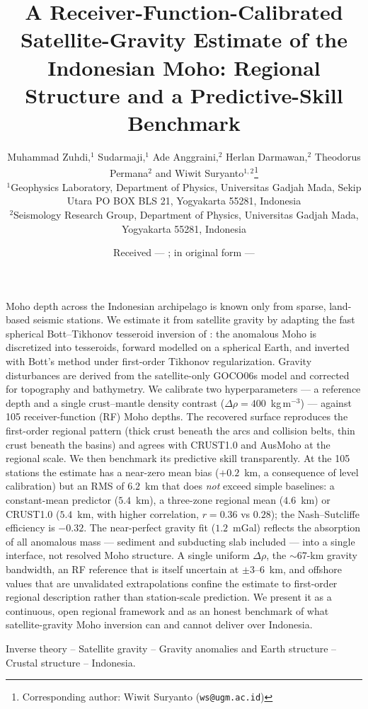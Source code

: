\documentclass[extra,mreferee]{gji}
\title[A gravity estimate of the Indonesian Moho]
      {A Receiver-Function-Calibrated Satellite-Gravity Estimate of the Indonesian
       Moho: Regional Structure and a Predictive-Skill Benchmark}
\author[Zuhdi et al.]{%
  Muhammad Zuhdi,$^{1}$ Sudarmaji,$^{1}$ Ade Anggraini,$^{2}$ Herlan Darmawan,$^{2}$
  Theodorus Permana$^{2}$ and Wiwit Suryanto$^{1,2}$\thanks{%
  Corresponding author: Wiwit Suryanto (\texttt{ws@ugm.ac.id})}\\
  $^{1}$Geophysics Laboratory, Department of Physics, Universitas Gadjah Mada, Sekip
  Utara PO BOX BLS 21, Yogyakarta 55281, Indonesia\\
  $^{2}$Seismology Research Group, Department of Physics, Universitas Gadjah Mada,
  Yogyakarta 55281, Indonesia}
\date{Received --- ; in original form ---}
\begin{document}
\label{firstpage}
\maketitle

\begin{summary}
Moho depth across the Indonesian archipelago is known only from sparse, land-based
seismic stations. We estimate it from satellite gravity by adapting the fast
spherical Bott--Tikhonov tesseroid inversion of \citet{uieda2017}: the anomalous
Moho is discretized into tesseroids, forward modelled on a spherical Earth, and
inverted with Bott's method under first-order Tikhonov regularization. Gravity
disturbances are derived from the satellite-only {GOCO06s} model and corrected for
topography and bathymetry. We calibrate two hyperparameters --- a reference depth
and a single crust--mantle density contrast ($\Delta\rho=400$~kg\,m$^{-3}$) ---
against 105 receiver-function (RF) Moho depths. The recovered surface reproduces the
first-order regional pattern (thick crust beneath the arcs and collision belts, thin
crust beneath the basins) and agrees with {CRUST1.0} and {AusMoho} at the regional
scale. We then benchmark its predictive skill transparently. At the 105 stations the
estimate has a near-zero mean bias ($+0.2$~km, a consequence of level calibration)
but an RMS of $6.2$~km that does \emph{not} exceed simple baselines: a constant-mean
predictor ($5.4$~km), a three-zone regional mean ($4.6$~km) or {CRUST1.0} ($5.4$~km,
with higher correlation, $r=0.36$ vs $0.28$); the Nash--Sutcliffe efficiency is
$-0.32$. The near-perfect gravity fit ($1.2$~mGal) reflects the absorption of all
anomalous mass --- sediment and subducting slab included --- into a single
interface, not resolved Moho structure. A single uniform $\Delta\rho$, the
$\sim$67-km gravity bandwidth, an RF reference that is itself uncertain at
$\pm3$--$6$~km, and offshore values that are unvalidated extrapolations confine the
estimate to first-order regional description rather than station-scale prediction.
We present it as a continuous, open regional framework and as an honest benchmark of
what satellite-gravity Moho inversion can and cannot deliver over Indonesia.
\end{summary}

\begin{keywords}
Inverse theory -- Satellite gravity -- Gravity anomalies and Earth structure --
Crustal structure -- Indonesia.
\end{keywords}

\end{document}
